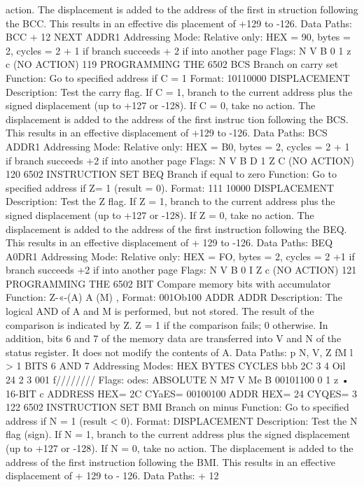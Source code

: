 action. The displacement is added to the address of the first in
struction following the BCC. This results in an effective dis
placement of +129 to -126.
Data Paths:
BCC
+ 12
NEXT ADDR1
Addressing Mode:
Relative only:
HEX = 90, bytes = 2, cycles = 2 + 1 if branch succeeds
+ 2 if into another page
Flags:
N V B 0 1 z c
(NO ACTION)
119
PROGRAMMING THE 6502
BCS Branch on carry set
Function:
Go to specified address if C = 1
Format: 10110000 DISPLACEMENT
Description:
Test the carry flag. If C = 1, branch to the current address plus
the signed displacement (up to +127 or -128). If C = 0, take no
action. The displacement is added to the address of the first instruc
tion following the BCS. This results in an effective displacement of
+129 to -126.
Data Paths:
BCS
ADDR1
Addressing Mode:
Relative only:
HEX = B0, bytes = 2, cycles = 2 + 1 if branch succeeds
+2 if into another page
Flags:
N V B D 1 Z C
(NO ACTION)
120
6502 INSTRUCTION SET
BEQ Branch if equal to zero
Function:
Go to specified address if Z= 1 (result = 0).
Format: 111 10000 DISPLACEMENT
Description:
Test the Z flag. If Z = 1, branch to the current address plus the
signed displacement (up to +127 or -128). If Z = 0, take no
action.
The displacement is added to the address of the first instruction
following the BEQ. This results in an effective displacement of
+ 129 to -126.
Data Paths:
BEQ
A0DR1
Addressing Mode:
Relative only:
HEX = FO, bytes = 2, cycles = 2 +1 if branch succeeds
+2 if into another page
Flags:
N V B 0 I Z c
(NO ACTION)
121
PROGRAMMING THE 6502
BIT Compare memory bits with accumulator
Function:
Z-«-(A) A (M) ,
Format: 001Ob100 ADDR ADDR
Description:
The logical AND of A and M is performed, but not stored. The result
of the comparison is indicated by Z. Z = 1 if the comparison fails; 0
otherwise. In addition, bits 6 and 7 of the memory data are transferred
into V and N of the status register. It does not modify the contents of A.
Data Paths:
p
N, V, Z
fM
l \V
> 1
BITS 6 AND 7
Addressing Modes:
HEX
BYTES
CYCLES
bbb
2C
3
4
Oil
24
2
3
001
f////////
Flags:
odes:
ABSOLUTE
N
M7
V
Me
B
00101100
0 1 z
•
16-BIT
c
ADDRESS
HEX= 2C CYaES=
00100100 ADDR
HEX= 24 CYQES= 3
122
6502 INSTRUCTION SET
BMI Branch on minus
Function:
Go to specified address if N = 1 (result < 0).
Format: DISPLACEMENT
Description:
Test the N flag (sign). If N = 1, branch to the current address
plus the signed displacement (up to +127 or -128). If N = 0, take
no action.
The displacement is added to the address of the first instruction
following the BMI. This results in an effective displacement of
+ 129 to - 126.
Data Paths:
+ 12
